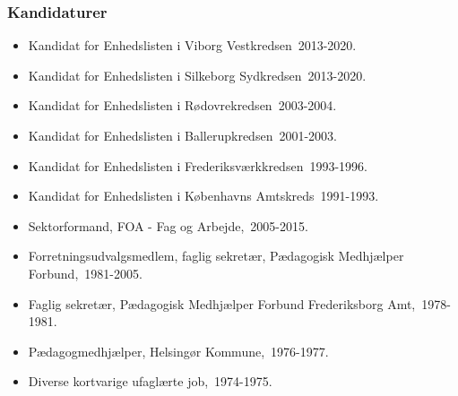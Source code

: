 \documentclass[11pt, a4paper]{awesome-cv}
\begin{document}
\begin{cvletter}
\subsubsection*{Kandidaturer}
\begin{itemize}
\item Kandidat for Enhedslisten i Viborg Vestkredsen 2013-2020.
\item Kandidat for Enhedslisten i Silkeborg Sydkredsen 2013-2020.
\item Kandidat for Enhedslisten i Rødovrekredsen 2003-2004.
\item Kandidat for Enhedslisten i Ballerupkredsen 2001-2003.
\item Kandidat for Enhedslisten i Frederiksværkkredsen 1993-1996.
\item Kandidat for Enhedslisten i Københavns Amtskreds 1991-1993.
\end{itemize}
\begin{itemize}
\item Sektorformand, FOA - Fag og Arbejde, 2005-2015.
\item Forretningsudvalgsmedlem, faglig sekretær, Pædagogisk Medhjælper Forbund, 1981-2005.
\item Faglig sekretær, Pædagogisk Medhjælper Forbund Frederiksborg Amt, 1978-1981.
\item Pædagogmedhjælper, Helsingør Kommune, 1976-1977.
\item Diverse kortvarige ufaglærte job, 1974-1975.
\end{itemize}
\end{cvletter}
\end{document}
